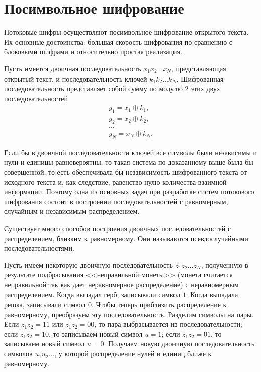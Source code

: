 ﻿\section{Посимвольное шифрование}

Потоковые шифры осуществляют посимвольное шифрование открытого текста. Их основные достоинства: большая скорость шифрования по сравнению с блоковыми шифрами и относительно простая реализация.

Пусть имеется двоичная последовательность $x_{1} x_{2} \dots x_{N}$, представляющая открытый текст, и последовательность ключей $k_{1} k_{2} \dots k_{N}$. Шифрованная последовательность представляет собой сумму по модулю 2 этих двух последовательностей
\[ \begin{array}{l}
    y_{1} = x_{1} \oplus k_{1}, \\
    y_{2} = x_{2} \oplus k_{2}, \\
    \dots \\
    y_{N} = x_{N} \oplus k_{N}.
\end{array} \]

Если бы в двоичной последовательности ключей все символы были независимы и нули и единицы равновероятны, то такая система по доказанному выше была бы совершенной, то есть обеспечивала бы независимость шифрованного текста от исходного текста и, как следствие, равенство нулю количества взаимной информации. Поэтому одна из основных задач при разработке систем потокового шифрования состоит в построении последовательностей с равномерным, случайным и независимым распределением.

Существует много способов построения двоичных последовательностей с распределением, близким к равномерному. Они называются псевдослучайными последовательностями.

Пусть имеем некоторую двоичную последовательность $z_{1} z_{2} \ldots z_{N}$, полученную в результате подбрасывания <<неправильной монеты>> (монета считается неправильной так как дает неравномерное распределение) с неравномерным распределением. Когда выпадал герб, записывали символ $1$. Когда выпадала решка, записывали символ $0$. Чтобы теперь приблизить распределение к равномерному, преобразуем эту последовательность. Разделим символы на пары. Если $z_{1} z_{2} = 11$ или $z_{1} z_{2} = 00$, то пара выбрасывается из последовательности; если $z_{1} z_{2} =10$, то записываем новый символ $u=1$; если $z_{1} z_{2} =01$, то записываем новый символ $u=0$. Получаем новую двоичную последовательность символов $u_{1}u_{2}\ldots $, у которой распределение нулей и единиц ближе к равномерному.
